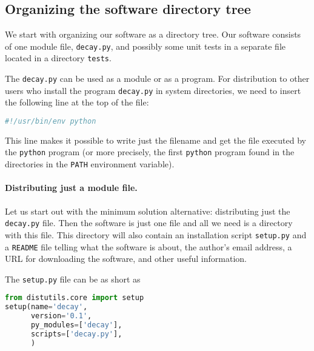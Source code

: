 \documentclass[graybox,sectrefs,envcountresetchap,open=right,final]{svmonodo}
\begin{document}
\noindent
\subsection{Organizing the software directory tree}

We start with organizing our software as a directory tree. Our
software consists of one module file, \texttt{decay.py}, and possibly some
unit tests in a separate file located in a directory \texttt{tests}.

The \texttt{decay.py} can be used as a module or as a program. For distribution
to other users who install the program \texttt{decay.py} in system directories,
we need to insert the following line at the top of the file:



\begin{lstlisting}[language=python,style=blue1_bluegreen]
#!/usr/bin/env python

\end{lstlisting}

This line makes it possible to write just the filename and get the
file executed by the \texttt{python} program (or more precisely, the first
\texttt{python} program found in the directories in the \texttt{PATH} environment
variable).

\paragraph{Distributing just a module file.}
Let us start out with the minimum solution alternative: distributing
just the \texttt{decay.py} file. Then the software is just one file and all
we need is a directory with this file. This directory will also
contain an installation script \texttt{setup.py} and a \texttt{README} file
telling what the software is about, the author's email address, a URL
for downloading the software, and other useful information.


The \texttt{setup.py} file can be as short as








\begin{lstlisting}[language=python,style=blue1bar_bluegreen]
from distutils.core import setup
setup(name='decay',
      version='0.1',
      py_modules=['decay'],
      scripts=['decay.py'],
      )

\end{lstlisting}
\end{document}
